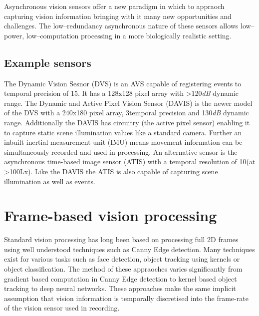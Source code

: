 Asynchronous vision sensors offer a new paradigm in which to appraoch capturing vision information bringing with it many new opportunities and challenges. 
The low--redundancy asynchronous nature of these sensors allows low--power, low--computation processing in a more biologically realistic setting.



\subsection{Example sensors}
The Dynamic Vision Sesnor (DVS) is an AVS capable of registering events to temporal precision of 15\us\cite{delbruck2008}. 
It has a 128x128 pixel array with \textgreater 120\textit{dB} dynamic range.
The Dynamic and Active Pixel Vision Sensor (DAVIS) is the newer model of the DVS with a 240x180 pixel array, 3\us temporal precision and 130\textit{dB} dynamic range\cite{DAVIS}. 
Additionally the DAVIS has circuitry (the active pixel sensor) enabling it to capture static scene illumination values like a standard camera.
Further an inbuilt inertial measurement unit (IMU) means movement information can be simultaneously recorded and used in processing. 
An alternative sensor is the asynchronous time-based image sensor (ATIS) with a temporal resolution of 10\us (at \textgreater100Lx)\cite{posch2011qvga}.
Like the DAVIS the ATIS is also capable of capturing scene illumination as well as events.  





\section{Frame-based vision processing}   %

Standard vision processing has long been based on processing full 2D frames using well understood techniques such as Canny Edge detection\cite{canny1986computational}. 
Many techniques exist for various tasks such as face detection\cite{viola2004robust}, object tracking using kernels\cite{comaniciu2003kernel} or object classification\cite{krizhevsky2012imagenet}.
The method of these appraoches varies significantly from gradient based computation in Canny Edge detection to kernel based object tracking to deep neural networks.
These approaches make the same implicit assumption that vision information is temporally discretised into the frame-rate of the vision sensor used in recording. 

